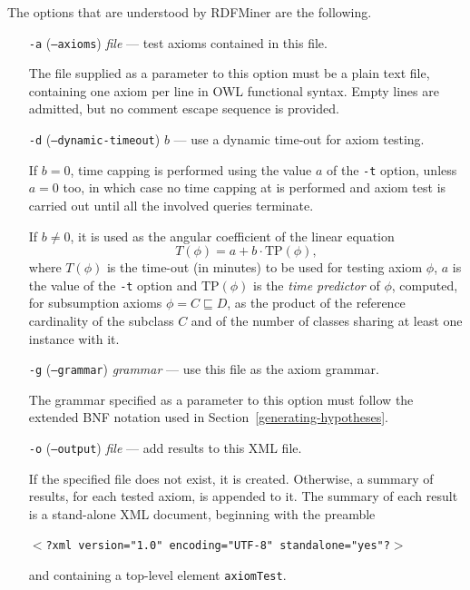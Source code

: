 \documentclass[a4paper]{article}
\newcounter{ex}
\begin{document}
The options that are understood by RDFMiner are the following.
\begin{enumerate}

\item[\texttt{-a}] (\texttt{--axioms}) \emph{file} --- test axioms contained in this file.

The file supplied as a parameter to this option must be a plain text file,
containing one axiom per line in OWL functional syntax.
Empty lines are admitted, but no comment escape sequence is provided.

\item[\texttt{-d}] (\texttt{--dynamic-timeout}) $b$ --- use a dynamic time-out for axiom testing.

If $b = 0$, time capping is performed using the value $a$ of the \texttt{-t} option,
unless $a = 0$ too, in which case no time capping at is performed and axiom test is carried out
until all the involved queries terminate.

If $b \neq 0$, it is used as the angular coefficient of the linear equation
\begin{equation}\label{eq:time-out}
  T(\phi) = a + b \cdot \mathrm{TP}(\phi),
\end{equation}
where $T(\phi)$ is the time-out (in minutes) to be used for testing axiom $\phi$,
$a$ is the value of the \texttt{-t} option and
$\mathrm{TP}(\phi)$ is the \emph{time predictor} of $\phi$,
computed, for subsumption axioms $\phi = C \sqsubseteq D$,
as the product of the reference cardinality of the subclass $C$ and of the number
of classes sharing at least one instance with it.

\item[\texttt{-g}] (\texttt{--grammar}) \emph{grammar} --- use this file as the axiom grammar.

The grammar specified as a parameter to this option must follow the extended BNF notation
used in Section~\ref{generating-hypotheses}.

\item[\texttt{-o}] (\texttt{--output}) \emph{file} --- add results to this XML file.

If the specified file does not exist, it is created. Otherwise, a summary of results,
for each tested axiom, is appended to it. The summary of each result is a stand-alone
XML document, beginning with the preamble
\begin{center}
  \texttt{$<$?xml version="1.0" encoding="UTF-8" standalone="yes"?$>$}
\end{center}
and containing a top-level element \texttt{axiomTest}.


\end{enumerate}
\end{document}
